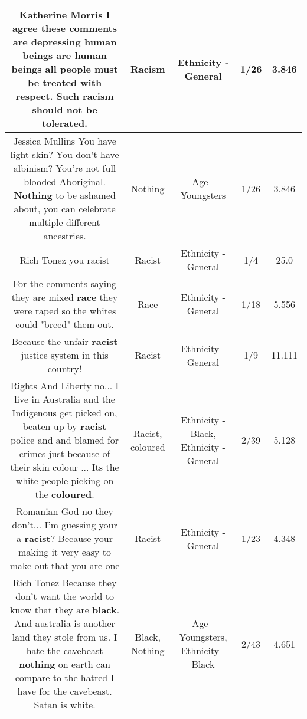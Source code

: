 \documentclass[11pt]{article}
\newlength\mylength
\begin{document}
\begin{center}
\begin{longtable}{|C{.65\mylength}|C{.30\mylength}|C{.12\mylength}|C{.12\mylength}|C{.12\mylength}|}
  \small Katherine Morris I agree these comments are depressing human beings are human beings all people must be treated with respect. Such \textbf{racism} should not be tolerated.\normalsize   & Racism & Ethnicity - General & 1/26 & 3.846 \\  \hline
  \small Jessica Mullins You have light skin? You don't have albinism? You're not full blooded Aboriginal. \textbf{Nothing} to be ashamed about, you can celebrate multiple different ancestries.\normalsize   & Nothing & Age - Youngsters & 1/26 & 3.846 \\  \hline
  \small Rich Tonez you racist\normalsize   & Racist & Ethnicity - General & 1/4 & 25.0 \\  \hline
  \small For the comments saying they are mixed \textbf{race} they were raped so the whites could "breed" them out.\normalsize   & Race & Ethnicity - General & 1/18 & 5.556 \\  \hline
  \small Because the unfair \textbf{racist} justice system in this country!\normalsize   & Racist & Ethnicity - General & 1/9 & 11.111 \\  \hline
  \small Rights And Liberty no... I live in Australia and the Indigenous get picked on, beaten up by \textbf{racist} police and and blamed for crimes just because of their skin colour ... Its the white people picking on the \textbf{coloured}.\normalsize   & Racist, coloured & Ethnicity - Black, Ethnicity - General & 2/39 & 5.128 \\  \hline
  \small Romanian God no they don't... I'm guessing your a \textbf{racist}? Because your making it very easy to make out that you are one\normalsize   & Racist & Ethnicity - General & 1/23 & 4.348 \\  \hline
  \small Rich Tonez Because they don't want the world to know that they are \textbf{black}. And australia is another land they stole from us. I hate the cavebeast \textbf{nothing} on earth can compare to the hatred I have for the cavebeast. Satan is white.\normalsize   & Black, Nothing & Age - Youngsters, Ethnicity - Black & 2/43 & 4.651 \\  \hline

\end{longtable}
\end{center}
\end{document}
